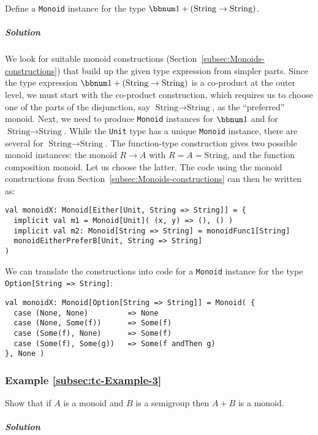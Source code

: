 Define a \lstinline!Monoid! instance for the type $\bbnum 1+(\text{String}\rightarrow\text{String})$.

\subparagraph{Solution}

We look for suitable monoid constructions (Section~\ref{subsec:Monoids-constructions})
that build up the given type expression from simpler parts. Since
the type expression $\bbnum 1+(\text{String}\rightarrow\text{String})$
is a co-product at the outer level, we must start with the co-product
construction, which requires us to choose one of the parts of the
disjunction, say $\text{String}\rightarrow\text{String}$, as the
\textsf{``}preferred\textsf{''} monoid. Next, we need to produce \lstinline!Monoid!
instances for $\bbnum 1$ and for $\text{String}\rightarrow\text{String}$.
While the \lstinline!Unit! type has a unique \lstinline!Monoid!
instance, there are several for $\text{String}\rightarrow\text{String}$.
The function-type construction gives two possible monoid instances:
the monoid $R\rightarrow A$ with $R=A=\text{String}$, and the function
composition monoid. Let us choose the latter. The code using the monoid
constructions from Section~\ref{subsec:Monoids-constructions} can
then be written as:
\begin{lstlisting}
val monoidX: Monoid[Either[Unit, String => String]] = {
  implicit val m1 = Monoid[Unit]( (x, y) => (), () )
  implicit val m2: Monoid[String => String] = monoidFunc1[String]
  monoidEitherPreferB[Unit, String => String]
)
\end{lstlisting}
We can translate the constructions into code for a \lstinline!Monoid!
instance for the type \lstinline!Option[String => String]!:
\begin{lstlisting}
val monoidX: Monoid[Option[String => String]] = Monoid( {
  case (None, None)         => None
  case (None, Some(f))      => Some(f)
  case (Some(f), None)      => Some(f)
  case (Some(f), Some(g))   => Some(f andThen g)
}, None )
\end{lstlisting}


\subsubsection{Example \label{subsec:tc-Example-3}\ref{subsec:tc-Example-3}}

Show that if $A$ is a monoid and $B$ is a semigroup then $A+B$
is a monoid.

\subparagraph{Solution}

